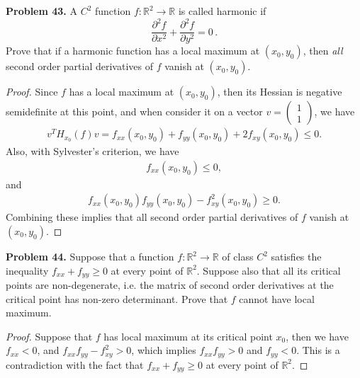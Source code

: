 \documentclass[12pt,leqno]{amsart}
\theoremstyle{definition}
\begin{document}
\noindent
{\bf Problem 43.}
A $C^2$ function $f:\mathbb{R}^2\to\mathbb{R}$ is called harmonic if
$$
\frac{\partial^2 f}{\partial x^2} +
\frac{\partial^2 f}{\partial y^2} = 0\, .
$$
Prove that if a harmonic function has a local maximum at $(x_0,y_0)$, then
{\em all} second order partial derivatives of $f$ vanish at $(x_0,y_0)$.
\begin{proof}
Since $f$ has a local maximum at $(x_0, y_0)$, then its Hessian is negative semidefinite at this point, and when consider it on a vector $v = \begin{pmatrix} 1 \\ 1 \end{pmatrix}$, we have
\begin{align*}
    v^T H_{x_0}(f) v = f_{xx}(x_0,y_0) + f_{yy}(x_0,y_0) + 2 f_{xy}(x_0,y_0) \leq 0.
\end{align*}
Also, with Sylvester's criterion, we have
\begin{align*}
    f_{xx}(x_0,y_0) \leq 0,
\end{align*}
and 
\begin{align*}
    f_{xx}(x_0,y_0) f_{yy}(x_0,y_0) - f^2_{xy}(x_0,y_0) \geq 0.
\end{align*}
Combining these implies that all second order partial derivatives of $f$ vanish at $(x_0,y_0)$.
\end{proof}

\medskip

\noindent
{\bf Problem 44.}
Suppose that a function $f:\mathbb{R}^2\to\mathbb{R}$ of class $C^2$
satisfies the inequality $f_{xx}+f_{yy}\geq 0$ at every point
of $\mathbb{R}^2$. Suppose also that all its critical points are non-degenerate, i.e. the matrix of second order derivatives
at the critical point has non-zero determinant.
Prove that $f$ cannot have local maximum.
\begin{proof}
Suppose that $f$ has local maximum at its critical point $x_0$, then we have $f_{xx} < 0$, and $f_{xx}f_{yy} - f_{xy}^2 > 0$, which implies $f_{xx}f_{yy} > 0$ and $f_{yy} < 0$. This is a contradiction with the fact that $f_{xx}+f_{yy}\geq 0$ at every point of $\mathbb{R}^2$.
\end{proof}

\medskip
\end{document}
